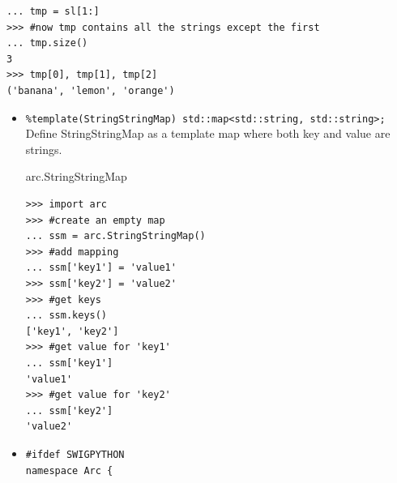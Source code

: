 \documentclass{article}
\begin{document}
\begin{flushleft}
\begin{itemize}
{\begin{example}
\begin{verbatim}
... tmp = sl[1:]
>>> #now tmp contains all the strings except the first
... tmp.size()
3
>>> tmp[0], tmp[1], tmp[2]
('banana', 'lemon', 'orange')
\end{verbatim}
    \end{example}
  }
\end{itemize}
\begin{itemize}
  \item{\verb$%template(StringStringMap) std::map<std::string, std::string>;$ \linebreak
    Define StringStringMap as a template map where both key and value are strings.\linebreak
    \begin{example}
      \caption{arc.StringStringMap}\label{mapex}
\begin{verbatim}
>>> import arc
>>> #create an empty map
... ssm = arc.StringStringMap()
>>> #add mapping
... ssm['key1'] = 'value1'
>>> ssm['key2'] = 'value2'
>>> #get keys
... ssm.keys()
['key1', 'key2']
>>> #get value for 'key1'
... ssm['key1']
'value1'
>>> #get value for 'key2'
... ssm['key2']
'value2'
\end{verbatim}
    \end{example}
  }
\end{itemize}
\begin{itemize}
  \item{ \begin{verbatim}
#ifdef SWIGPYTHON
namespace Arc {


\end{verbatim}}
\end{itemize}
\end{flushleft}
\end{document}

